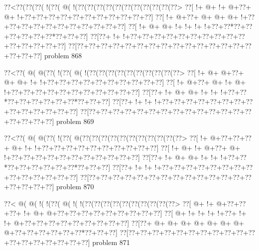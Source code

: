 \vbox{\vbox{\goo
\0??<\0??(\0??(\0??(\- !(\0??(\- @(\- !(\0??(\0??(\0??(\0??(\0??(\0??(\0??(\0??(\0??(\0??(\0??>
\0??[\- !+\- @+\- !+\- @+\0??+\- @+\- !+\0??+\0??+\0??+\0??+\0??+\0??+\0??+\0??+\0??+\0??+\0??]
\0??[\- !+\- @+\0??+\- @+\- @+\- @+\- !+\0??+\0??+\0??+\0??+\0??+\0??+\0??+\0??+\0??+\0??+\0??]
\0??[\- !+\- @+\- @+\- !+\- !+\- !+\- !+\0??+\0??*\0??+\0??+\0??+\0??+\0??+\0??*\0??+\0??+\0??]
\0??[\0??+\- !+\- !+\0??+\0??+\0??+\0??+\0??+\0??+\0??+\0??+\0??+\0??+\0??+\0??+\0??+\0??+\0??]
\0??[\0??+\0??+\0??+\0??+\0??+\0??+\0??+\0??+\0??+\0??+\0??+\0??+\0??+\0??+\0??+\0??+\0??+\0??]
}
\hfil problem 868\hfil\break
}



\vbox{\vbox{\goo
\0??<\0??(\- @(\- @(\0??(\- !(\0??(\- @(\- !(\0??(\0??(\0??(\0??(\0??(\0??(\0??(\0??(\0??(\0??>
\0??[\- !+\- @+\- @+\0??+\- @+\- @+\- !+\- !+\0??+\0??+\0??+\0??+\0??+\0??+\0??+\0??+\0??+\0??]
\0??[\- !+\- @+\0??+\- @+\- !+\- @+\- !+\0??+\0??+\0??+\0??+\0??+\0??+\0??+\0??+\0??+\0??+\0??]
\0??[\0??+\- !+\- @+\- @+\- !+\- !+\- !+\0??+\0??*\0??+\0??+\0??+\0??+\0??+\0??*\0??+\0??+\0??]
\0??[\0??+\- !+\- !+\- !+\0??+\0??+\0??+\0??+\0??+\0??+\0??+\0??+\0??+\0??+\0??+\0??+\0??+\0??]
\0??[\0??+\0??+\0??+\0??+\0??+\0??+\0??+\0??+\0??+\0??+\0??+\0??+\0??+\0??+\0??+\0??+\0??+\0??]
}
\hfil problem 869\hfil\break
}



\vbox{\vbox{\goo
\0??<\0??(\- @(\- @(\0??(\- !(\0??(\- @(\0??(\0??(\0??(\0??(\0??(\0??(\0??(\0??(\0??(\0??(\0??>
\0??[\- !+\- @+\0??+\0??+\0??+\- @+\- !+\- !+\0??+\0??+\0??+\0??+\0??+\0??+\0??+\0??+\0??+\0??]
\0??[\- !+\- @+\- !+\- @+\0??+\- @+\- !+\0??+\0??+\0??+\0??+\0??+\0??+\0??+\0??+\0??+\0??+\0??]
\0??[\0??+\- !+\- @+\- @+\- !+\- !+\- !+\0??+\0??*\0??+\0??+\0??+\0??+\0??+\0??*\0??+\0??+\0??]
\0??[\0??+\- !+\- !+\- !+\0??+\0??+\0??+\0??+\0??+\0??+\0??+\0??+\0??+\0??+\0??+\0??+\0??+\0??]
\0??[\0??+\0??+\0??+\0??+\0??+\0??+\0??+\0??+\0??+\0??+\0??+\0??+\0??+\0??+\0??+\0??+\0??+\0??]
}
\hfil problem 870\hfil\break
}



\vbox{\vbox{\goo
\0??<\- @(\- @(\- !(\- !(\0??(\- @(\- !(\- !(\0??(\0??(\0??(\0??(\0??(\0??(\0??(\0??(\0??(\0??>
\0??[\- @+\- !+\- @+\0??+\0??+\0??+\- !+\- @+\- @+\0??+\0??+\0??+\0??+\0??+\0??+\0??+\0??+\0??]
\0??[\- @+\- !+\- !+\- !+\- !+\0??+\- !+\- !+\- @+\0??+\0??+\0??+\0??+\0??+\0??+\0??+\0??+\0??]
\0??[\0??+\- @+\- @+\- @+\- @+\- @+\- @+\- @+\- @+\0??+\0??+\0??+\0??+\0??+\0??*\0??+\0??+\0??]
\0??[\0??+\0??+\0??+\0??+\0??+\0??+\0??+\0??+\0??+\0??+\0??+\0??+\0??+\0??+\0??+\0??+\0??+\0??]
}
\hfil problem 871\hfil\break
}



